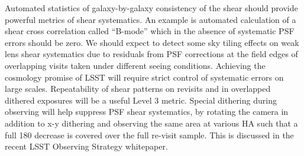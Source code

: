 \documentclass[SE,toc,lsstdraft]{lsstdoc}
\newcommand{\newtext}[1]{{\color{blue} #1}}
\begin{document}
Automated statistics of galaxy-by-galaxy consistency of the shear should provide powerful metrics of shear systematics.  An example is automated calculation of a shear cross correlation called ``B-mode'' which in the absence of systematic PSF errors should be zero. We should expect to detect some sky tiling effects on weak lens shear systematics due to residuals from PSF corrections at the field edges of overlapping visits taken under different seeing conditions. Achieving the cosmology promise of LSST will require strict control of systematic errors on large scales. Repeatability of shear patterns on revisits and in overlapped dithered exposures will be a useful Level 3 metric.
\newtext{
Special dithering during observing will help suppress PSF shear systematics, by rotating the camera in addition to x-y dithering and observing the same area at various HA such that a full 180 decrease is covered over the full re-visit sample. This is discussed in the recent LSST Observing Strategy whitepaper.  %
}


\end{document}
